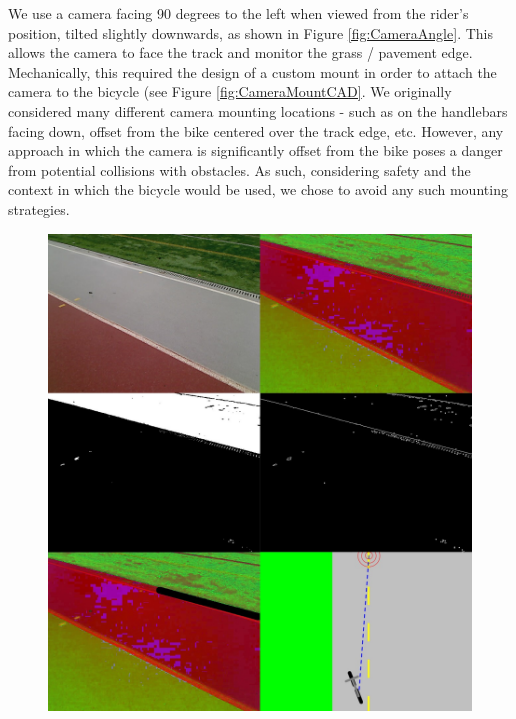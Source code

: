 \documentclass[aps,twocolumn,secnumarabic,balancelastpage,amsmath,amssymb,nofootinbib]{revtex4-1}
\begin{document}
We use a camera facing 90 degrees to the left when viewed from the rider's position, tilted slightly downwards, as shown in Figure \ref{fig:CameraAngle}. This allows the camera to face the track and monitor the grass / pavement edge. Mechanically, this required the design of a custom mount in order to attach the camera to the bicycle (see Figure \ref{fig:CameraMountCAD}. We originally considered many different camera mounting locations - such as on the handlebars facing down, offset from the bike centered over the track edge, etc. However, any approach in which the camera is significantly offset from the bike poses a danger from potential collisions with obstacles. As such, considering safety and the context in which the bicycle would be used, we chose to avoid any such mounting strategies.

\begin{figure}
\includegraphics[scale=0.18]{cv_overview.jpg}

\end{figure}
\end{document}

